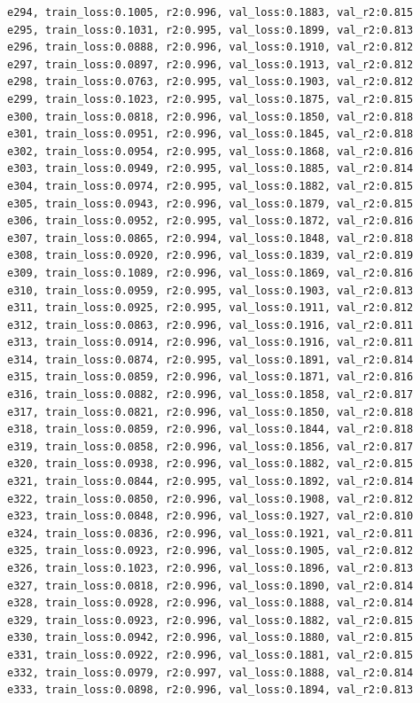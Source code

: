 \documentclass[a4paper, 12pt]{article}
\begin{document}
\begin{lstlisting}
e294, train_loss:0.1005, r2:0.996, val_loss:0.1883, val_r2:0.815
e295, train_loss:0.1031, r2:0.995, val_loss:0.1899, val_r2:0.813
e296, train_loss:0.0888, r2:0.996, val_loss:0.1910, val_r2:0.812
e297, train_loss:0.0897, r2:0.996, val_loss:0.1913, val_r2:0.812
e298, train_loss:0.0763, r2:0.995, val_loss:0.1903, val_r2:0.812
e299, train_loss:0.1023, r2:0.995, val_loss:0.1875, val_r2:0.815
e300, train_loss:0.0818, r2:0.996, val_loss:0.1850, val_r2:0.818
e301, train_loss:0.0951, r2:0.996, val_loss:0.1845, val_r2:0.818
e302, train_loss:0.0954, r2:0.995, val_loss:0.1868, val_r2:0.816
e303, train_loss:0.0949, r2:0.995, val_loss:0.1885, val_r2:0.814
e304, train_loss:0.0974, r2:0.995, val_loss:0.1882, val_r2:0.815
e305, train_loss:0.0943, r2:0.996, val_loss:0.1879, val_r2:0.815
e306, train_loss:0.0952, r2:0.995, val_loss:0.1872, val_r2:0.816
e307, train_loss:0.0865, r2:0.994, val_loss:0.1848, val_r2:0.818
e308, train_loss:0.0920, r2:0.996, val_loss:0.1839, val_r2:0.819
e309, train_loss:0.1089, r2:0.996, val_loss:0.1869, val_r2:0.816
e310, train_loss:0.0959, r2:0.995, val_loss:0.1903, val_r2:0.813
e311, train_loss:0.0925, r2:0.995, val_loss:0.1911, val_r2:0.812
e312, train_loss:0.0863, r2:0.996, val_loss:0.1916, val_r2:0.811
e313, train_loss:0.0914, r2:0.996, val_loss:0.1916, val_r2:0.811
e314, train_loss:0.0874, r2:0.995, val_loss:0.1891, val_r2:0.814
e315, train_loss:0.0859, r2:0.996, val_loss:0.1871, val_r2:0.816
e316, train_loss:0.0882, r2:0.996, val_loss:0.1858, val_r2:0.817
e317, train_loss:0.0821, r2:0.996, val_loss:0.1850, val_r2:0.818
e318, train_loss:0.0859, r2:0.996, val_loss:0.1844, val_r2:0.818
e319, train_loss:0.0858, r2:0.996, val_loss:0.1856, val_r2:0.817
e320, train_loss:0.0938, r2:0.996, val_loss:0.1882, val_r2:0.815
e321, train_loss:0.0844, r2:0.995, val_loss:0.1892, val_r2:0.814
e322, train_loss:0.0850, r2:0.996, val_loss:0.1908, val_r2:0.812
e323, train_loss:0.0848, r2:0.996, val_loss:0.1927, val_r2:0.810
e324, train_loss:0.0836, r2:0.996, val_loss:0.1921, val_r2:0.811
e325, train_loss:0.0923, r2:0.996, val_loss:0.1905, val_r2:0.812
e326, train_loss:0.1023, r2:0.996, val_loss:0.1896, val_r2:0.813
e327, train_loss:0.0818, r2:0.996, val_loss:0.1890, val_r2:0.814
e328, train_loss:0.0928, r2:0.996, val_loss:0.1888, val_r2:0.814
e329, train_loss:0.0923, r2:0.996, val_loss:0.1882, val_r2:0.815
e330, train_loss:0.0942, r2:0.996, val_loss:0.1880, val_r2:0.815
e331, train_loss:0.0922, r2:0.996, val_loss:0.1881, val_r2:0.815
e332, train_loss:0.0979, r2:0.997, val_loss:0.1888, val_r2:0.814
e333, train_loss:0.0898, r2:0.996, val_loss:0.1894, val_r2:0.813

\end{lstlisting}
\end{document}
